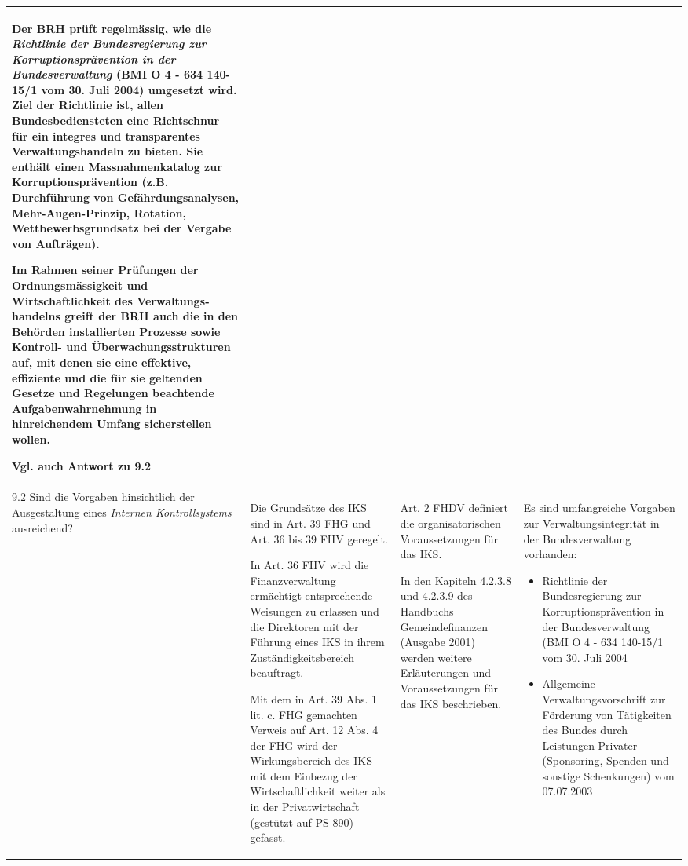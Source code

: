\documentclass[10pt]{article}
\begin{document}
\begin{landscape}
\begin{center}
\begin{longtable}{|p{4cm}|p{5cm}|p{7.5cm}|p{7.5cm}|}
Der BRH prüft regelmässig, wie die \textit{Richtlinie der Bundesregierung zur Korruptionsprävention in der Bundesverwaltung} (BMI O 4 - 634 140-15/1 vom 30. Juli 2004) umgesetzt wird. Ziel der Richtlinie ist, allen Bundesbediensteten eine Richtschnur für ein integres und transparentes Verwaltungshandeln zu bieten. Sie enthält einen Massnahmenkatalog zur Korruptionsprävention (z.B. Durchführung von Gefährdungsanalysen, Mehr-Augen-Prinzip, Rotation, Wettbewerbsgrundsatz bei der Vergabe von Aufträgen). 

Im Rahmen seiner Prüfungen der Ordnungsmässigkeit und Wirtschaftlichkeit des Verwaltungs­handelns greift der BRH auch die in den Behörden installierten Prozesse sowie Kontroll- und Überwachungs­strukturen auf, mit denen sie eine effektive, effiziente und die für sie geltenden Gesetze und Regelungen beachtende Aufgabenwahrnehmung in hinreichendem Umfang sicherstellen wollen.

Vgl. auch Antwort zu 9.2

 \\
\hline
9.2 Sind die Vorgaben hinsichtlich der Ausgestaltung eines \textit{Internen Kontrollsystems} ausreichend? & Die Grundsätze des IKS sind in Art. 39 FHG und Art. 36 bis 39 FHV geregelt.

In Art. 36 FHV wird die Finanzverwaltung ermächtigt entsprechende Weisungen zu erlassen und die Direktoren mit der Führung eines IKS in ihrem Zuständigkeitsbereich beauftragt.

Mit dem in Art. 39 Abs. 1 lit. c. FHG gemachten Verweis auf Art. 12 Abs. 4 der FHG wird der Wirkungsbereich des IKS mit dem Einbezug der Wirtschaftlichkeit weiter als in der Privatwirtschaft (gestützt auf PS 890) gefasst.

 & Art. 2 FHDV definiert die organisatorischen Voraussetzungen für das IKS.

In den Kapiteln 4.2.3.8 und 4.2.3.9 des Handbuchs Gemeindefinanzen (Ausgabe 2001) werden weitere Erläuterungen und Voraussetzungen für das IKS beschrieben.

 & Es sind umfangreiche Vorgaben zur Verwaltungsintegrität in der Bundesverwaltung vorhanden:

\begin{itemize}
    \item Richtlinie der Bundesregierung zur Korruptionsprävention in der Bundesverwaltung (BMI O 4 - 634 140-15/1 vom 30. Juli 2004

    \item Allgemeine Verwaltungsvorschrift zur Förderung von Tätigkeiten des Bundes durch Leistungen Privater (Sponsoring, Spenden und sonstige Schenkungen) vom 07.07.2003


\end{itemize}
\end{longtable}
\end{center}
\end{landscape}
\end{document}
